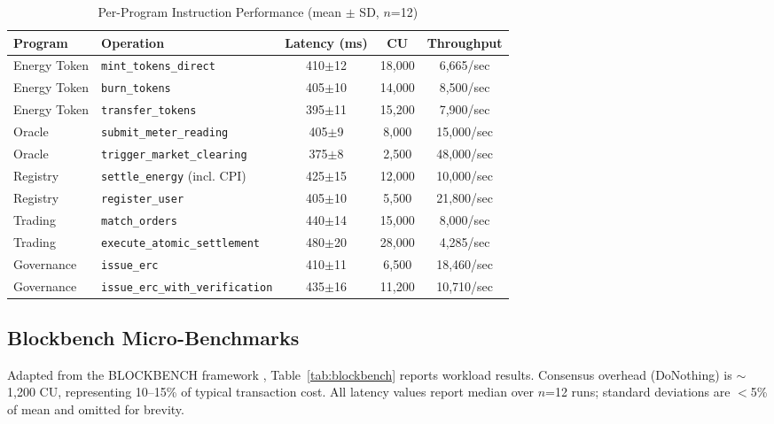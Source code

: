 \documentclass[conference]{IEEEtran}
\begin{document}
\begin{table}[htbp]
\caption{Per-Program Instruction Performance (mean $\pm$ SD, $n$=12)}
\begin{center}
\begin{tabular}{llccc}
\toprule
\textbf{Program} & \textbf{Operation} & \textbf{Latency (ms)} & \textbf{CU} & \textbf{Throughput} \\
\midrule
Energy Token & \texttt{mint\_tokens\_direct} & 410$\pm$12 & 18,000 & 6,665/sec \\
Energy Token & \texttt{burn\_tokens} & 405$\pm$10 & 14,000 & 8,500/sec \\
Energy Token & \texttt{transfer\_tokens} & 395$\pm$11 & 15,200 & 7,900/sec \\
\midrule
Oracle & \texttt{submit\_meter\_reading} & 405$\pm$9 & 8,000 & 15,000/sec \\
Oracle & \texttt{trigger\_market\_clearing} & 375$\pm$8 & 2,500 & 48,000/sec \\
\midrule
Registry & \texttt{settle\_energy} (incl. CPI) & 425$\pm$15 & 12,000 & 10,000/sec \\
Registry & \texttt{register\_user} & 405$\pm$10 & 5,500 & 21,800/sec \\
\midrule
Trading & \texttt{match\_orders} & 440$\pm$14 & 15,000 & 8,000/sec \\
Trading & \texttt{execute\_atomic\_settlement} & 480$\pm$20 & 28,000 & 4,285/sec \\
\midrule
Governance & \texttt{issue\_erc} & 410$\pm$11 & 6,500 & 18,460/sec \\
Governance & \texttt{issue\_erc\_with\_verification} & 435$\pm$16 & 11,200 & 10,710/sec \\
\bottomrule
\end{tabular}
\label{tab:per-program}
\end{center}
\end{table}

\subsection{Blockbench Micro-Benchmarks}

Adapted from the BLOCKBENCH framework \cite{blockbench}, Table~\ref{tab:blockbench} reports workload results. Consensus overhead (DoNothing) is $\sim$1,200 CU, representing 10--15\% of typical transaction cost. All latency values report median over $n$=12 runs; standard deviations are $<$5\% of mean and omitted for brevity.
\end{document}
